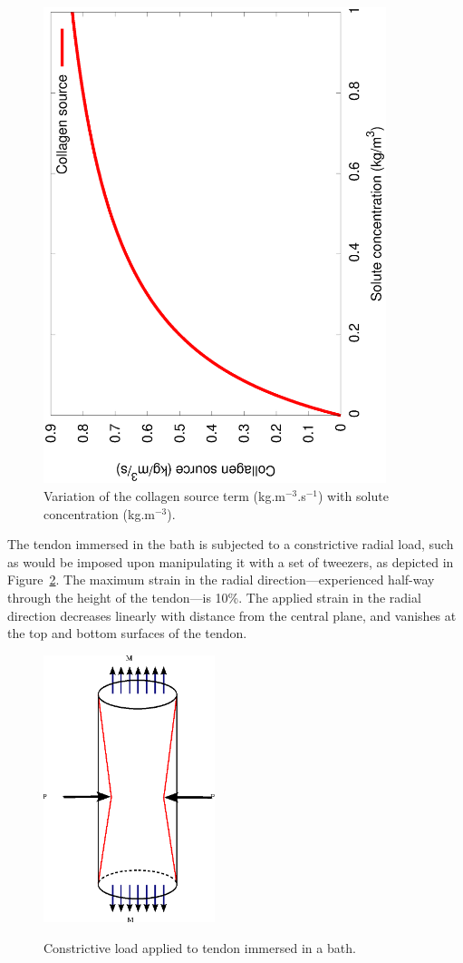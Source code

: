 \begin{figure}
\centering
\includegraphics[angle=270,width=10.00cm]{images/enzyme-kinetics.eps}
\caption{Variation of the collagen source term (kg.m$^{-3}$.s$^{-1}$)
  with solute concentration (kg.m$^{-3}$).}
\label{eg3menten}
\end{figure}

The tendon immersed in the bath is subjected to a constrictive
radial load, such
as would be imposed upon  manipulating it with a set of tweezers, as depicted in
Figure~\ref{constrictload}. The
maximum strain in the radial 
direction---experienced half-way through the height of the tendon---is
10\%. The applied strain in the radial direction decreases linearly
with distance from the central plane, and vanishes at the top and
bottom surfaces of the tendon. 


\begin{figure}[ht]
  \centering
         {\includegraphics[width=5.0cm]{images/cylinder-in-bath.eps}}
	 \caption{Constrictive load applied to tendon immersed in a
	 bath.} 
	 \label{constrictload}
\end{figure}

